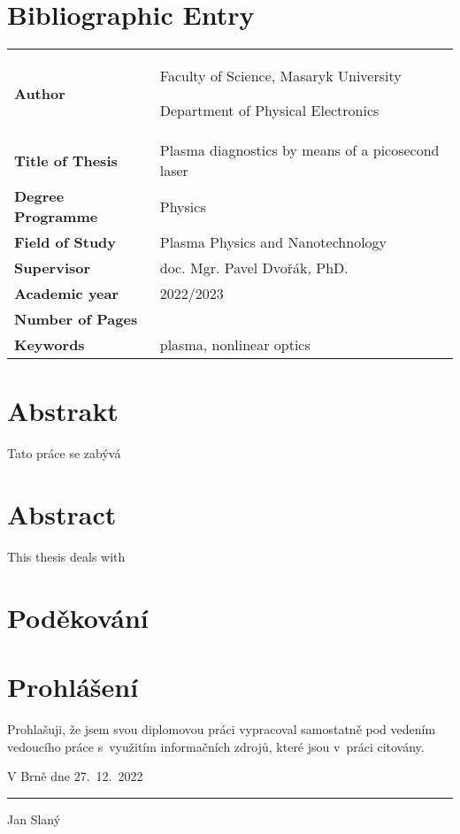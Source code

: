 \chapter*{Bibliographic Entry}
\thispagestyle{empty}
\bgroup
\renewcommand{\arraystretch}{\bibentryspacing}
\begin{tabularx}{\textwidth}{l X}
	\textbf{Author}           & \theauthor\par
	                            Faculty of Science, Masaryk University\par
	                            Department of Physical Electronics \\
	\textbf{Title of Thesis}  & Plasma diagnostics by means of a picosecond laser \\
	\textbf{Degree Programme} & Physics \\
	\textbf{Field of Study}   & Plasma Physics and Nanotechnology \\
	\textbf{Supervisor}       & doc. Mgr. Pavel Dvořák, PhD. \\
	\textbf{Academic year}    & 2022/2023 \\
	\textbf{Number of Pages}  & \pageref*{lastpage} \\
	\textbf{Keywords}         & plasma, nonlinear optics \\
\end{tabularx}
\egroup

\chapter*{Abstrakt}
Tato práce se zabývá
\vfill
{\let\clearpage\relax\chapter*{Abstract}}
\thispagestyle{empty}
This thesis deals with

\cleardoublepage
% 

\chapter*{Poděkování}
\vfill

{\let\clearpage\relax\chapter*{Prohlášení}}
\thispagestyle{empty}
Prohlašuji, že jsem svou diplomovou práci vypracoval samostatně
pod vedením vedoucího práce s~využitím informačních zdrojů,
které jsou v~práci citovány.
\bigskip

\noindent
V Brně dne 27.~12.~2022
\hfill
\parbox{6cm}{
	\centering
	\vspace{1.5cm}
	\rule{6cm}{0.1pt}\par
	Jan Slaný
}
